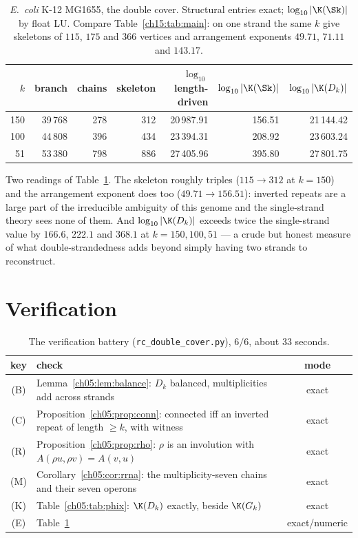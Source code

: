 \begin{table}[ht]
\centering\small
\begin{tabular}{rrrrrrr}
\toprule
$k$ & branch & chains & skeleton & $\log_{10}$ length-driven & $\log_{10}|\K(\Sk)|$
& $\log_{10}|\K(D_k)|$\\
\midrule
150 & 39\,768 & 278 & 312 & 20\,987.91 & 156.51 & 21\,144.42\\
100 & 44\,808 & 396 & 434 & 23\,394.31 & 208.92 & 23\,603.24\\
 51 & 53\,380 & 798 & 886 & 27\,405.96 & 395.80 & 27\,801.75\\
\bottomrule
\end{tabular}
\caption{\emph{E.\ coli} K-12 MG1655, the double cover. Structural entries exact;
$\log_{10}|\K(\Sk)|$ by float LU. Compare Table~\ref{ch15:tab:main}: on one strand the same $k$
give skeletons of $115$, $175$ and $366$ vertices and arrangement exponents $49.71$,
$71.11$ and $143.17$.}
\label{ch05:tab:ecoli}
\end{table}

Two readings of Table~\ref{ch05:tab:ecoli}. The skeleton roughly triples ($115\to312$ at
$k=150$) and the arrangement exponent does too ($49.71\to156.51$): inverted repeats are a
large part of the irreducible ambiguity of this genome and the single-strand theory sees
none of them. And $\log_{10}|\K(D_k)|$ exceeds twice the single-strand value by $166.6$,
$222.1$ and $368.1$ at $k=150,100,51$ --- a crude but honest measure of what
double-strandedness adds beyond simply having two strands to reconstruct.

\section{Verification}\label{ch05:sec:battery}

\begin{table}[ht]
\centering\small
\begin{tabular}{clc}
\toprule
key & check & mode\\
\midrule
(B) & Lemma~\ref{ch05:lem:balance}: $D_k$ balanced, multiplicities add across strands & exact\\
(C) & Proposition~\ref{ch05:prop:conn}: connected iff an inverted repeat of length $\ge k$, with witness & exact\\
(R) & Proposition~\ref{ch05:prop:rho}: $\rho$ is an involution with $A(\rho u,\rho v)=A(v,u)$ & exact\\
(M) & Corollary~\ref{ch05:cor:rrna}: the multiplicity-seven chains and their seven operons & exact\\
(K) & Table~\ref{ch05:tab:phix}: $\K(D_k)$ exactly, beside $\K(G_k)$ & exact\\
(E) & Table~\ref{ch05:tab:ecoli} & exact/numeric\\
\bottomrule
\end{tabular}
\caption{The verification battery (\texttt{rc\_double\_cover.py}), $6/6$, about $33$
seconds.}
\label{ch05:tab:battery}
\end{table}

